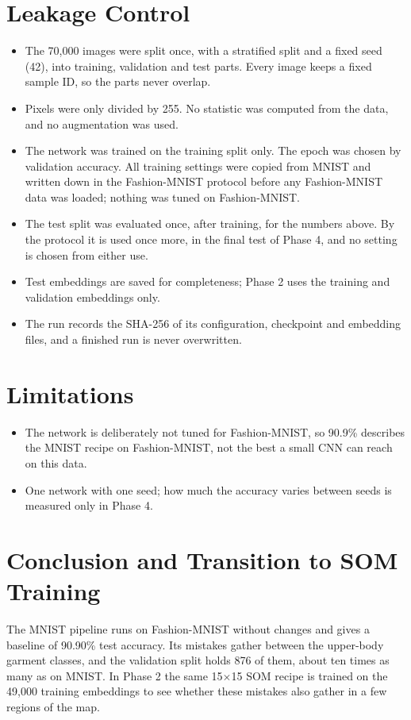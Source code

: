 \documentclass[11pt]{article}
\begin{document}
\section{Leakage Control}

\begin{itemize}
  \item The 70,000 images were split once, with a stratified split and a fixed seed (42), into training, validation and test parts. Every image keeps a fixed sample ID, so the parts never overlap.
  \item Pixels were only divided by 255. No statistic was computed from the data, and no augmentation was used.
  \item The network was trained on the training split only. The epoch was chosen by validation accuracy. All training settings were copied from MNIST and written down in the Fashion-MNIST protocol before any Fashion-MNIST data was loaded; nothing was tuned on Fashion-MNIST.
  \item The test split was evaluated once, after training, for the numbers above. By the protocol it is used once more, in the final test of Phase 4, and no setting is chosen from either use.
  \item Test embeddings are saved for completeness; Phase 2 uses the training and validation embeddings only.
  \item The run records the SHA-256 of its configuration, checkpoint and embedding files, and a finished run is never overwritten.
\end{itemize}

\section{Limitations}

\begin{itemize}[leftmargin=1.4em, itemsep=1pt]
  \item The network is deliberately not tuned for Fashion-MNIST, so 90.9\% describes the MNIST recipe on Fashion-MNIST, not the best a small CNN can reach on this data.
  \item One network with one seed; how much the accuracy varies between seeds is measured only in Phase 4.
\end{itemize}

\section{Conclusion and Transition to SOM Training}

The MNIST pipeline runs on Fashion-MNIST without changes and gives a baseline of 90.90\% test accuracy. Its mistakes gather between the upper-body garment classes, and the validation split holds 876 of them, about ten times as many as on MNIST. In Phase 2 the same 15$\times$15 SOM recipe \cite{jafari_nnsom} is trained on the 49,000 training embeddings to see whether these mistakes also gather in a few regions of the map.

\clearpage
\printbibliography[title={References}]
\end{document}
